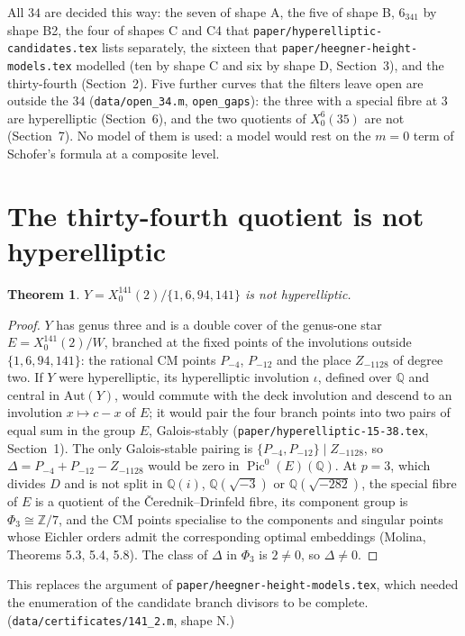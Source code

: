 \documentclass[11pt,reqno]{amsart}
\theoremstyle{plain}
\newtheorem{theorem}{Theorem}[section]
\theoremstyle{definition}
\DeclareMathOperator{\Pic}{Pic}
\newcommand{\Q}{\mathbb{Q}}
\newcommand{\Z}{\mathbb{Z}}
\begin{document}
All $34$ are decided this way: the seven of shape A, the five of shape B, $6_{341}$ by shape B2, the four of
shapes C and C4 that \texttt{paper/hyperelliptic-candidates.tex} lists separately, the sixteen that
\texttt{paper/heegner-height-models.tex} modelled (ten by shape C and six by shape D, Section~3), and the
thirty-fourth (Section~2). Five further curves that the filters leave open are outside the $34$
(\texttt{data/open\_34.m}, \texttt{open\_gaps}): the three with a special fibre at $3$ are hyperelliptic
(Section~6), and the two quotients of $X_0^6(35)$ are not (Section~7). No model of them is used: a model
would rest on the $m=0$ term of Schofer's formula at a composite level.

\section{The thirty-fourth quotient is not hyperelliptic}

\begin{theorem}
$Y=X_0^{141}(2)/\{1,6,94,141\}$ is not hyperelliptic.
\end{theorem}

\begin{proof}
$Y$ has genus three and is a double cover of the genus-one star $E=X_0^{141}(2)/W$, branched at the fixed
points of the involutions outside $\{1,6,94,141\}$: the rational CM points $P_{-4}$, $P_{-12}$ and the place
$Z_{-1128}$ of degree two. If $Y$ were hyperelliptic, its hyperelliptic involution $\iota$, defined over $\Q$
and central in $\mathrm{Aut}(Y)$, would commute with the deck involution and descend to an involution
$x\mapsto c-x$ of $E$; it would pair the four branch points into
two pairs of equal sum in the group $E$, Galois-stably (\texttt{paper/hyperelliptic-15-38.tex}, Section~1). The
only Galois-stable pairing is $\{P_{-4},P_{-12}\}\mid Z_{-1128}$, so $\Delta=P_{-4}+P_{-12}-Z_{-1128}$ would be
zero in $\Pic^0(E)(\Q)$. At $p=3$, which divides $D$ and is not split in $\Q(i)$, $\Q(\sqrt{-3})$ or
$\Q(\sqrt{-282})$, the special fibre of $E$ is a quotient of the \v{C}erednik--Drinfeld fibre, its component
group is $\Phi_3\cong\Z/7$, and the CM points specialise to the components and singular points whose Eichler
orders admit the corresponding optimal embeddings (Molina, Theorems 5.3, 5.4, 5.8). The class of $\Delta$ in
$\Phi_3$ is $2\neq0$, so $\Delta\neq0$.
\end{proof}

This replaces the argument of \texttt{paper/heegner-height-models.tex}, which needed the enumeration of the
candidate branch divisors to be complete. (\texttt{data/certificates/141\_2.m}, shape N.)
\end{document}
